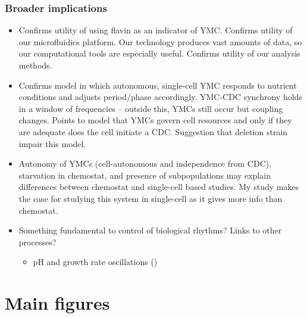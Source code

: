 \subsubsection{Broader implications}
\label{sec:org94e4378}
\begin{itemize}
\item Confirms utility of using flavin as an indicator of YMC.  Confirms utility of our microfluidics platform.  Our technology produces vast amounts of data, so our computational tools are especially useful.  Confirms utility of our analysis methods.
\item Confirms model in which autonomous, single-cell YMC responds to nutrient conditions and adjusts period/phase accordingly.  YMC-CDC synchrony holds in a window of frequencies -- outside this, YMCs still occur but coupling changes.  Points to model that YMCs govern cell resources and only if they are adequate does the cell initiate a CDC.  Suggestion that deletion strain impair this model.
\item Autonomy of YMCs (cell-autonomous and independence from CDC), starvation in chemostat, and presence of subpopulations may explain differences between chemostat and single-cell based studies.  My study makes the case for studying this system in single-cell as it gives more info than chemostat.
\item Something fundamental to control of biological rhythms?  Links to other processes?
\begin{itemize}
\item pH and growth rate oscillations (\cite{luziaPHDependenciesGlycolytic})
\end{itemize}
\end{itemize}

\section{Main figures}
\label{sec:orgf9d497f}

